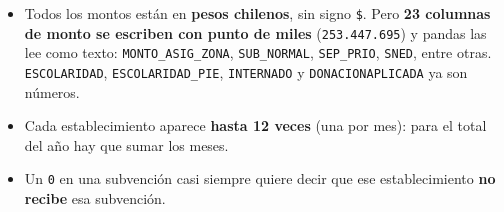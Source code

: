 \documentclass[10.5pt]{article}
\begin{document}
\begin{alertabox}
\begin{itemize}[leftmargin=1.1em,itemsep=2pt,topsep=2pt]
\item Todos los montos están en \textbf{pesos chilenos}, sin signo \texttt{\$}. Pero \textbf{23 columnas de monto se escriben con punto de miles} (\texttt{253.447.695}) y pandas las lee como texto: \texttt{MONTO\_\allowbreak{}ASIG\_\allowbreak{}ZONA}, \texttt{SUB\_\allowbreak{}NORMAL}, \texttt{SEP\_\allowbreak{}PRIO}, \texttt{SNED}, entre otras. \texttt{ESCOLARIDAD}, \texttt{ESCOLARIDAD\_\allowbreak{}PIE}, \texttt{INTERNADO} y \texttt{DONACIONAPLICADA} ya son números.
\item Cada establecimiento aparece \textbf{hasta 12 veces} (una por mes): para el total del año hay que sumar los meses.
\item Un \texttt{0} en una subvención casi siempre quiere decir que ese establecimiento \textbf{no recibe} esa subvención.
\end{itemize}
\end{alertabox}

\newpage
{}\label{base7}\hypertarget{base7}{}
\end{document}

